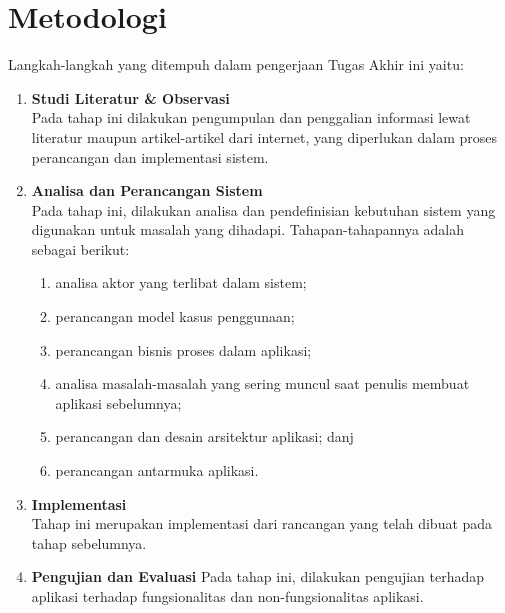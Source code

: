     \section{Metodologi}
    \label{metodologi}
	Langkah-langkah yang ditempuh dalam pengerjaan Tugas Akhir ini yaitu:
    \begin{enumerate}
    	\item \textbf{Studi Literatur \& Observasi} \\
		       Pada tahap ini dilakukan pengumpulan dan penggalian informasi lewat literatur maupun artikel-artikel dari internet, yang diperlukan dalam proses perancangan dan implementasi sistem.
    	\item \textbf{Analisa dan Perancangan Sistem}\\
		    	Pada tahap ini, dilakukan analisa dan pendefinisian kebutuhan sistem yang digunakan untuk masalah yang dihadapi. Tahapan-tahapannya adalah sebagai berikut:
		    	\begin{enumerate}[label=\alph*]
		    		\item analisa aktor yang terlibat dalam sistem;
		    		\item perancangan model kasus penggunaan;
		    		\item perancangan bisnis proses dalam aplikasi;
		    		\item analisa masalah-masalah yang sering muncul saat penulis membuat aplikasi sebelumnya;
		    		\item perancangan dan desain arsitektur aplikasi; danj
		    		\item perancangan antarmuka aplikasi.
		    	\end{enumerate}
    	\item \textbf{Implementasi}\\
		    	Tahap ini merupakan implementasi dari rancangan yang telah dibuat pada tahap sebelumnya.
    	\item \textbf{Pengujian dan Evaluasi}
		    	Pada tahap ini, dilakukan pengujian terhadap aplikasi terhadap fungsionalitas dan non-fungsionalitas aplikasi. 
	   	\end{enumerate}
	   	
